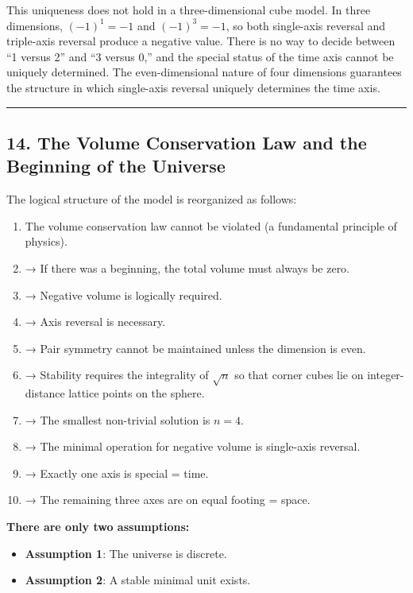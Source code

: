 \documentclass[a4paper,11pt]{article}
\theoremstyle{definition}
\providecommand{\tightlist}{\setlength{\itemsep}{0pt}\setlength{\parskip}{0pt}}
\begin{document}
This uniqueness does not hold in a three-dimensional cube model. In
three dimensions, \((-1)^1 = -1\) and \((-1)^3 = -1\), so both
single-axis reversal and triple-axis reversal produce a negative value.
There is no way to decide between ``1 versus 2'' and ``3 versus 0,'' and
the special status of the time axis cannot be uniquely determined. The
even-dimensional nature of four dimensions guarantees the structure in
which single-axis reversal uniquely determines the time axis.

\begin{center}\rule{0.5\linewidth}{0.5pt}\end{center}

\subsection{14. The Volume Conservation Law and the Beginning of the
Universe}\label{the-volume-conservation-law-and-the-beginning-of-the-universe}

The logical structure of the model is reorganized as follows:

\begin{enumerate}
\def\labelenumi{\arabic{enumi}.}
\tightlist
\item
  The volume conservation law cannot be violated (a fundamental
  principle of physics).
\item
  → If there was a beginning, the total volume must always be zero.
\item
  → Negative volume is logically required.
\item
  → Axis reversal is necessary.
\item
  → Pair symmetry cannot be maintained unless the dimension is even.
\item
  → Stability requires the integrality of \(\sqrt{n}\) so that corner
  cubes lie on integer-distance lattice points on the sphere.
\item
  → The smallest non-trivial solution is \(n = 4\).
\item
  → The minimal operation for negative volume is single-axis reversal.
\item
  → Exactly one axis is special = time.
\item
  → The remaining three axes are on equal footing = space.
\end{enumerate}

\textbf{There are only two assumptions:}

\begin{itemize}
\tightlist
\item
  \textbf{Assumption 1}: The universe is discrete.
\item
  \textbf{Assumption 2}: A stable minimal unit exists.
\end{itemize}
\end{document}
